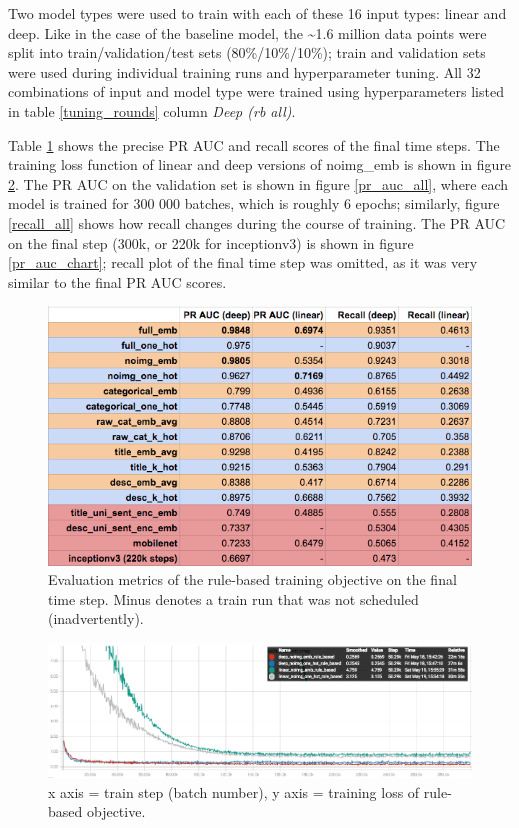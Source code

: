 Two model types were used to train with each of these 16 input types: linear and deep.
Like in the case of the baseline model, the \textasciitilde1.6 million data points were split into train/validation/test sets (80\%/10\%/10\%); train and validation sets were used during individual training runs and hyperparameter tuning.
All 32 combinations of input and model type were trained using hyperparameters listed in table \ref{tuning_rounds} column \textit{Deep (rb all)}.

Table \ref{metrics_all} shows the precise PR AUC and recall scores of the final time steps.
The training loss function of linear and deep versions of noimg\_emb is shown in figure \ref{train_loss_all}.
The PR AUC on the validation set is shown in figure \ref{pr_auc_all}, where each model is trained for 300 000 batches, which is roughly 6 epochs; similarly, figure \ref{recall_all} shows how recall changes during the course of training.
The PR AUC on the final step (300k, or 220k for inceptionv3) is shown in figure \ref{pr_auc_chart}; recall plot of the final time step was omitted, as it was very similar to the final PR AUC scores.

\begin{figure}
  \includegraphics[width=\linewidth]{figures/metrics_all}
  \caption{Evaluation metrics of the rule-based training objective on the final time step. Minus denotes a train run that was not scheduled (inadvertently).}
  \label{metrics_all}
\end{figure}

\begin{figure}
  \includegraphics[width=\linewidth]{figures/train_loss_all}
  \caption{x axis = train step (batch number), y axis = training loss of rule-based objective.}
  \label{train_loss_all}
\end{figure}

